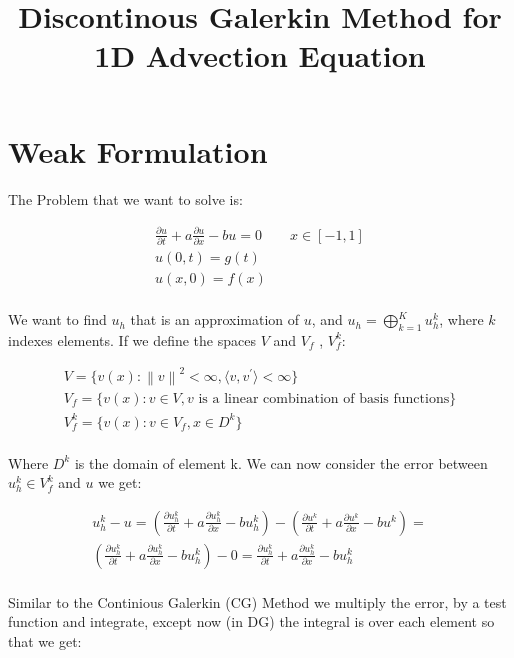 \documentclass{article}
\newcommand{\norm}[1]{\left\lVert#1\right\rVert}
\begin{document}
\title{Discontinous Galerkin Method for 1D Advection Equation}
\author{}
\maketitle


\section{Weak Formulation}
  
\noindent The Problem that we want to solve is:

\begin{gather*}
  \frac{\partial u}{\partial t} + a \frac{\partial u}{\partial x} - bu = 0 \qquad x \in [-1, 1] \\
  u(0, t) = g(t) \\
  u(x, 0) = f(x) \\
\end{gather*}

\noindent We want to find $u_h$ that is an approximation of $u$, and $u_h = \bigoplus_{k=1}^K u_h^k$, where $k$ indexes elements. If we define the spaces $V$ and $V_f$ , $V_f^k$:

\begin{gather*}
  V = \{ v(x) : \norm{v}^2 < \infty, \langle v, v^{\prime}\rangle < \infty\} \\
  V_f = \{ v(x) : v \in V, v \text{ is a linear combination of basis functions}\} \\
  V_f^k = \{ v(x) : v \in V_f, x \in D^k\}\\
\end{gather*}

\noindent Where $D^k$ is the domain of element k.  We can now consider the error between  $u_h^k \in V_f^k$ and $u$ we get:

\begin{gather*}
  u_h^k - u = \left(\frac{\partial u_h^k}{\partial t} + a \frac{\partial u_h^k}{\partial x} - bu_h^k\right) - \left(\frac{\partial u^k}{\partial t} + a \frac{\partial u^k}{\partial x} - bu^k\right) = \\
  \left(\frac{\partial u_h^k}{\partial t} + a \frac{\partial u_h^k}{\partial x} - bu_h^k\right) - 0 = \frac{\partial u_h^k}{\partial t} + a \frac{\partial u_h^k}{\partial x} - bu_h^k \\
\end{gather*}

\noindent Similar to the Continious Galerkin (CG) Method we multiply the error, by a test function and integrate, except now (in DG) the integral is over each element so that we get:
\end{document}
